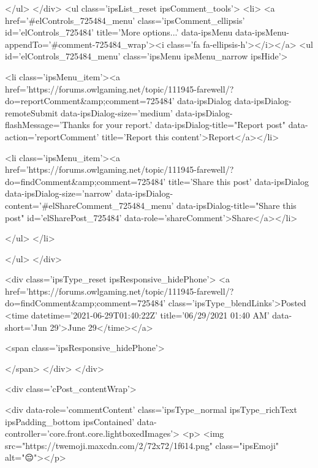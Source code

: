 					
					
					
					
				</ul>
			</div>
			<ul class='ipsList_reset ipsComment_tools'>
				<li>
					<a href='#elControls_725484_menu' class='ipsComment_ellipsis' id='elControls_725484' title='More options...' data-ipsMenu data-ipsMenu-appendTo='#comment-725484_wrap'><i class='fa fa-ellipsis-h'></i></a>
					<ul id='elControls_725484_menu' class='ipsMenu ipsMenu_narrow ipsHide'>
						
							<li class='ipsMenu_item'><a href='https://forums.owlgaming.net/topic/111945-farewell/?do=reportComment&amp;comment=725484' data-ipsDialog data-ipsDialog-remoteSubmit data-ipsDialog-size='medium' data-ipsDialog-flashMessage='Thanks for your report.' data-ipsDialog-title="Report post" data-action='reportComment' title='Report this content'>Report</a></li>
						
						
							<li class='ipsMenu_item'><a href='https://forums.owlgaming.net/topic/111945-farewell/?do=findComment&amp;comment=725484' title='Share this post' data-ipsDialog data-ipsDialog-size='narrow' data-ipsDialog-content='#elShareComment_725484_menu' data-ipsDialog-title="Share this post" id='elSharePost_725484' data-role='shareComment'>Share</a></li>
						
                        
						
						
						
							
								
							
							
							
							
							
							
						
					</ul>
				</li>
				
			</ul>
		</div>

		<div class='ipsType_reset ipsResponsive_hidePhone'>
			<a href='https://forums.owlgaming.net/topic/111945-farewell/?do=findComment&amp;comment=725484' class='ipsType_blendLinks'>Posted <time datetime='2021-06-29T01:40:22Z' title='06/29/2021 01:40  AM' data-short='Jun 29'>June 29</time></a> 
			
			<span class='ipsResponsive_hidePhone'>
				
				
			</span>
		</div>
	</div>

	

    

	<div class='cPost_contentWrap'>
		
		<div data-role='commentContent' class='ipsType_normal ipsType_richText ipsPadding_bottom ipsContained' data-controller='core.front.core.lightboxedImages'>
			<p>
	<img src="https://twemoji.maxcdn.com/2/72x72/1f614.png" class="ipsEmoji" alt="😔"></p>


